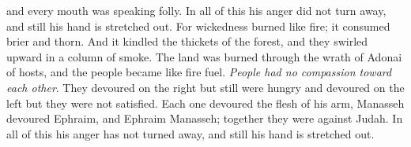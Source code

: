 \begin{biblechapter}
and every mouth was speaking folly. 
In all of this his anger did not turn away, 
and still his hand is stretched out.
\verse For wickedness burned like fire; 
it consumed brier and thorn. 
And it kindled the thickets of the forest, 
and they swirled upward in a column of smoke.
\verse The land was burned through the wrath of Adonai of hosts, 
and the people became like fire fuel. 
\textit{People had no compassion toward each other}.
\verse They devoured on the right but still were hungry 
and devoured on the left but they were not satisfied. 
Each one devoured the flesh of his arm,
\verse Manasseh devoured Ephraim, and Ephraim Manasseh; 
together they were against Judah. 
In all of this his anger has not turned away, 
and still his hand is stretched out.
\end{biblechapter}

